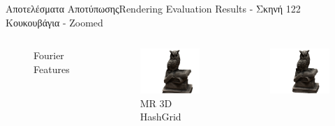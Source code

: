 \documentclass[10pt]{beamer}
\begin{document}
\begin{frame}{Αποτελέσματα Αποτύπωσης}{Rendering Evaluation Results - Σκηνή 122 Κουκουβάγια - Zoomed}
\begin{columns}[T]
\begin{figure}
                \caption{\tiny{Fourier Features}}
            \end{figure}
            \begin{figure}
                \includegraphics[height=.3\textheight, width=\linewidth, keepaspectratio]{images/chapter5_img/RenderingResults/MRHashGrid3D/eval_055_zoomed.jpg}
                \caption{\tiny{MR 3D HashGrid}}
            \end{figure}
            \begin{figure}
                \includegraphics[height=.3\textheight, width=\linewidth, keepaspectratio]{images/chapter5_img/RenderingResults/NFFB/eval_055_zoomed.jpg}

\end{figure}
\end{columns}
\end{frame}
\end{document}
